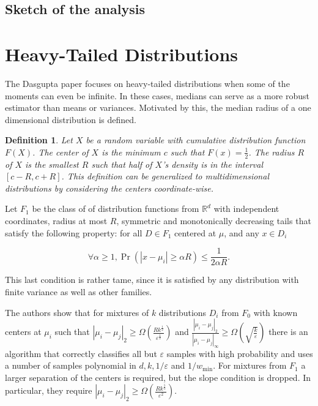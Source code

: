 \documentclass[11pt,letter]{article}
\newtheorem{definition}{Definition}
\begin{document}
\subsection{Sketch of the analysis}

\section{Heavy-Tailed Distributions}

The Dasgupta paper \cite{Dasgupta05heavy-tail} focuses on heavy-tailed distributions when some of the  moments can even be infinite. In these cases, medians can serve as a more robust estimator than means or variances. Motivated by this, the median radius of a one dimensional distribution is defined. 

\begin{definition}
Let $X$ be a random variable with cumulative distribution function $F(X)$. The center of $X$ is the minimum $c$ such that $F(x) = \frac{1}{2}$. The radius $R$ of $X$ is the smallest $R$ such that half of $X$'s density is in the interval $[c-R, c+R]$. This definition can be generalized to multidimensional distributions by considering the centers coordinate-wise. 
\end{definition}

Let $F_1$ be the class of of distribution functions from $\mathbb{R}^d$ with independent coordinates, radius at most $R$, symmetric and monotonically decreasing tails that satisfy the following property: for all $D \in F_1$ centered at ${\mu}$, and any $x \in D_i$ 

$$ \forall \alpha \geq 1, \Pr{(|x-\mu_i| \geq \alpha R)} \leq \frac{1}{2\alpha R}. $$

This last condition is rather tame, since it is satisfied by any distribution with finite variance as well as other families.

The authors show that for mixtures of $k$ distributions $D_i$ from $F_0$ with known centers at $\mu_i$ such that $| \mu_i - \mu_j |_2 \geq \Omega\left(\frac{Rk^\frac{1}{2}}{\varepsilon^{\frac{1}{2}}} \right)$ and $\frac{|\mu_i - \mu_j|_2}{|\mu_i-\mu_j|_{\infty}} \geq \Omega{\left( \sqrt{\frac{k}{\varepsilon}}\right)}$ there is an algorithm that correctly classifies all but $\varepsilon$ samples with high probability and uses a number of samples polynomial in $d, k, 1/\varepsilon$ and $1/w_{\min}$. For mixtures from $F_1$ a larger separation of the centers is required, but the slope condition is dropped. In particular, they require $|\mu_i - \mu_j |_2 \geq \Omega \left(\frac{Rk^{\frac{5}{2}}}{\varepsilon^{2}}\right)$. 
\end{document}
